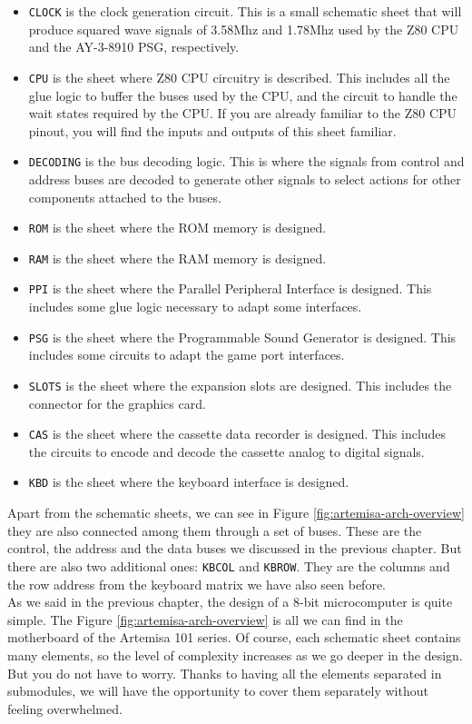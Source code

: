 \begin{itemize}
  \item {\tt CLOCK} is the clock generation circuit. This is a small schematic sheet that will produce squared wave signals of 3.58Mhz and 1.78Mhz used by the Z80 CPU and the AY-3-8910 PSG, respectively.
  \item {\tt CPU} is the sheet where Z80 CPU circuitry is described. This includes all the glue logic to buffer the buses used by the CPU, and the circuit to handle the wait states required by the CPU. If you are already familiar to the Z80 CPU pinout, you will find the inputs and outputs of this sheet familiar.
  \item {\tt DECODING} is the bus decoding logic. This is where the signals from control and address buses are decoded to generate other signals to select actions for other components attached to the buses.
  \item {\tt ROM} is the sheet where the ROM memory is designed.
  \item {\tt RAM} is the sheet where the RAM memory is designed.
  \item {\tt PPI} is the sheet where the Parallel Peripheral Interface is designed. This includes some glue logic necessary to adapt some interfaces.
  \item {\tt PSG} is the sheet where the Programmable Sound Generator is designed. This includes some circuits to adapt the game port interfaces.
  \item {\tt SLOTS} is the sheet where the expansion slots are designed. This includes the connector for the graphics card.
  \item {\tt CAS} is the sheet where the cassette data recorder is designed. This includes the circuits to encode and decode the cassette analog to digital signals.
  \item {\tt KBD} is the sheet where the keyboard interface is designed.
\end{itemize}

Apart from the schematic sheets, we can see in Figure \ref{fig:artemisa-arch-overview} they are also connected among them through a set of buses. These are the control, the address and the data buses we discussed in the previous chapter. But there are also two additional ones: {\tt KBCOL} and {\tt KBROW}. They are the columns and the row address from the keyboard matrix we have also seen before.\\

As we said in the previous chapter, the design of a 8-bit microcomputer is quite simple. The Figure \ref{fig:artemisa-arch-overview} is all we can find in the motherboard of the Artemisa 101 series. Of course, each schematic sheet contains many elements, so the level of complexity increases as we go deeper in the design. But you do not have to worry. Thanks to having all the elements separated in submodules, we will have the opportunity to cover them separately without feeling overwhelmed.
